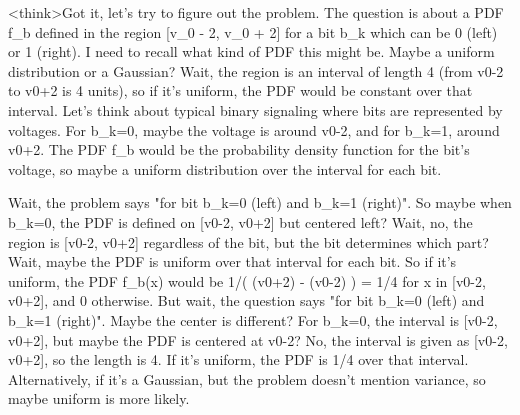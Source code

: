 <think>Got it, let's try to figure out the problem. The question is about a PDF f_b defined in the region [v_0 - 2, v_0 + 2] for a bit b_k which can be 0 (left) or 1 (right). I need to recall what kind of PDF this might be. Maybe a uniform distribution or a Gaussian? Wait, the region is an interval of length 4 (from v0-2 to v0+2 is 4 units), so if it's uniform, the PDF would be constant over that interval. Let's think about typical binary signaling where bits are represented by voltages. For b_k=0, maybe the voltage is around v0-2, and for b_k=1, around v0+2. The PDF f_b would be the probability density function for the bit's voltage, so maybe a uniform distribution over the interval for each bit. 

Wait, the problem says "for bit b_k=0 (left) and b_k=1 (right)". So maybe when b_k=0, the PDF is defined on [v0-2, v0+2] but centered left? Wait, no, the region is [v0-2, v0+2] regardless of the bit, but the bit determines which part? Wait, maybe the PDF is uniform over that interval for each bit. So if it's uniform, the PDF f_b(x) would be 1/( (v0+2) - (v0-2) ) = 1/4 for x in [v0-2, v0+2], and 0 otherwise. But wait, the question says "for bit b_k=0 (left) and b_k=1 (right)". Maybe the center is different? For b_k=0, the interval is [v0-2, v0+2], but maybe the PDF is centered at v0-2? No, the interval is given as [v0-2, v0+2], so the length is 4. If it's uniform, the PDF is 1/4 over that interval. Alternatively, if it's a Gaussian, but the problem doesn't mention variance, so maybe uniform is more likely. 

